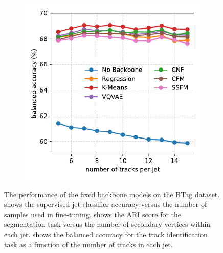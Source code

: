 \begin{figure}[h!]
\begin{subfigure}[b]{0.32\textwidth}
        \caption{}
        \label{fig:vtx_frozen_ari}
    \end{subfigure}
    \begin{subfigure}[b]{0.32\textwidth}
        \centering
        \includegraphics[width=\linewidth]{Figures/foundation_models/mpm2/final/trk_frozen.pdf}
        \caption{}
        \label{fig:trk_frozen}
    \end{subfigure}
    \caption{The performance of the fixed backbone models on the BTag dataset.  shows the supervised jet classifier accuracy versus the number of samples used in fine-tuning.
         shows the ARI score for the segmentation task versus the number of secondary vertices within each jet.   shows the balanced accuracy for the track identification task as a function of the number of tracks in each jet.}
    \label{fig:outdist_fixed}
\end{figure}

